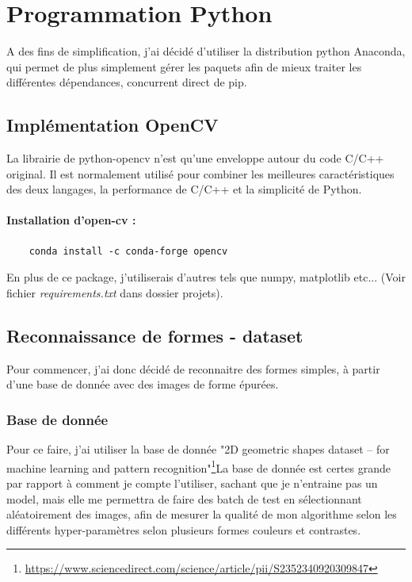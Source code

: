 \clearpage
\section{Programmation Python}
A des fins de simplification, j'ai décidé d'utiliser la distribution python Anaconda, qui permet de plus simplement gérer les paquets afin de mieux traiter les différentes dépendances, concurrent direct de pip.

\subsection{Implémentation OpenCV}
La librairie de python-opencv n'est qu'une enveloppe autour du code C/C++ original. Il est normalement utilisé pour combiner les meilleures caractéristiques des deux langages, la performance de C/C++ et la simplicité de Python.

\paragraph{Installation d'open-cv :}
\begin{verbatim}
	conda install -c conda-forge opencv
\end{verbatim}
En plus de ce package, j'utiliserais d'autres tels que numpy, matplotlib etc... (Voir fichier \textit{requirements.txt} dans dossier projets).

\subsection{Reconnaissance de formes - dataset}
	Pour commencer, j'ai donc décidé de reconnaitre des formes simples, à partir d'une base de donnée avec des images de forme épurées.
	\subsubsection{Base de donnée}
	Pour ce faire, j'ai utiliser la base de donnée "2D geometric shapes dataset – for machine learning and pattern recognition"\footnote{\href{https://www.sciencedirect.com/science/article/pii/S2352340920309847}{https://www.sciencedirect.com/science/article/pii/S2352340920309847}}La base de donnée est certes grande par rapport à comment je compte l'utiliser, sachant que je n'entraine pas un model, mais elle me permettra de faire des batch de test en sélectionnant aléatoirement des images, afin de mesurer la qualité de mon algorithme selon les différents hyper-paramètres selon plusieurs formes couleurs et contrastes.
	
